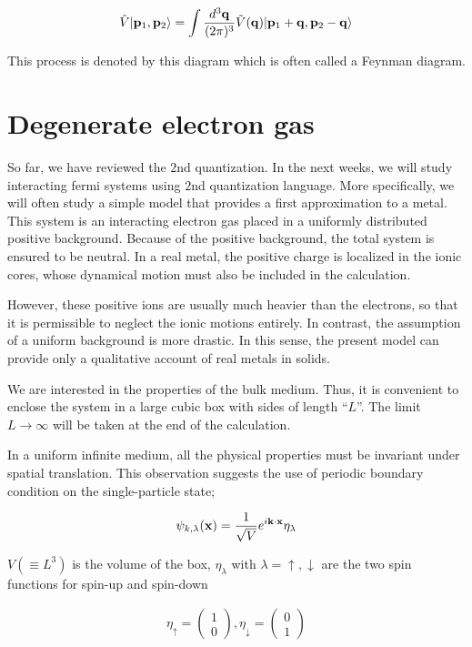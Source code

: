 \begin{align}
\hat{V}|{\bf p}_1,{\bf p}_2\rangle = \int\frac{d^3\bf q}{(2\pi)^3}\tilde{V}({\bf q})|{\bf p}_1+{\bf q},{\bf p}_2-{\bf q}\rangle
\end{align}

This process is denoted by this diagram which is often called a Feynman diagram. 

\section{Degenerate electron gas}

So far, we have reviewed the $2$nd quantization. In the next weeks, we will study interacting fermi systems using $2$nd quantization language. More specifically, we will often study a simple model that provides a first approximation to a metal. This system is an interacting electron gas placed in a uniformly distributed positive background. Because of the positive background, the total system is ensured to be neutral. In a real metal, the positive charge is localized in the ionic cores, whose dynamical motion must also be included in the calculation. 

However, these positive ions are usually much heavier than the electrons, so that it is permissible to neglect the ionic motions entirely. In contrast, the assumption of a uniform background is more drastic. In this sense, the present model can provide only a qualitative account of real metals in solids. 

We are interested in the properties of the bulk medium. Thus, it is convenient to enclose the system in a large cubic box with sides of length ``$L$''. The limit $L\rightarrow\infty$ will be taken at the end of the calculation. 

In a uniform infinite medium, all the physical properties must be invariant under spatial translation. This observation suggests the use of periodic boundary condition on the single-particle state;

\begin{align}
\psi_{k,\lambda}({\bf x}) = \frac{1}{\sqrt{V}}e^{i\bf k\cdot x}\eta_{\lambda}
\end{align}

$V(\equiv L^3)$ is the volume of the box, $\eta_\lambda$ with $\lambda = \uparrow,\downarrow$ are the two spin functions for spin-up and spin-down

\begin{align}
\eta_\uparrow = \left(\begin{matrix}1\\0\end{matrix}\right),\eta_\downarrow = \left(\begin{matrix}0\\1\end{matrix}\right)
\end{align}

